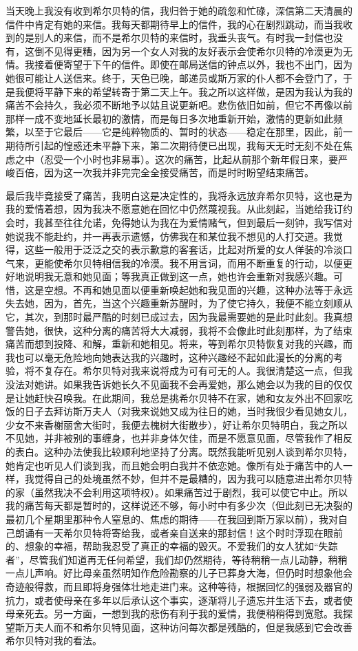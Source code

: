 \par 当天晚上我没有收到希尔贝特的信，我归咎于她的疏忽和忙碌，深信第二天清晨的信件中肯定有她的来信。我每天都期待早上的信件，我的心在剧烈跳动，而当我收到的是别人的来信，而不是希尔贝特的来信时，我垂头丧气。有时我一封信也没有，这倒不见得更糟，因为另一个女人对我的友好表示会使希尔贝特的冷漠更为无情。我接着便寄望于下午的信件。即使在邮局送信的钟点以外，我也不出门，因为她很可能让人送信来。终于，天色已晚，邮递员或斯万家的仆人都不会登门了，于是我便将平静下来的希望转寄于第二天上午。我之所以这样做，是因为我认为我的痛苦不会持久，我必须不断地予以姑且说更新吧。悲伤依旧如前，但它不再像以前那样一成不变地延长最初的激情，而是每日多次地重新开始，激情的更新如此频繁，以至于它最后——它是纯粹物质的、暂时的状态——稳定在那里，因此，前一期待所引起的惶惑还未平静下来，第二次期待便已出现，我每天无时无刻不处在焦虑之中（忍受一个小时也非易事）。这次的痛苦，比起从前那个新年假日来，要严峻百倍，因为这一次我并非完完全全接受痛苦，而是时时盼望结束痛苦。
\par 最后我毕竟接受了痛苦，我明白这是决定性的，我将永远放弃希尔贝特，这也是为我的爱情着想，因为我决不愿意她在回忆中仍然蔑视我。从此刻起，当她给我订约会时，我甚至往往允诺，免得她认为我在为爱情赌气，但到最后一刻钟，我写信对她说我不能赴约，并一再表示遗憾，仿佛我在和某位我不想见的人打交道。我觉得，这些一般用于泛泛之交的表示歉意的客套话，比起对所爱的女人佯装的冷淡口气来，更能使希尔贝特相信我的冷漠。我不用言词，而用不断重复的行动，以便更好地说明我无意和她见面；等我真正做到这一点，她也许会重新对我感兴趣。可惜，这是空想。不再和她见面以便重新唤起她和我见面的兴趣，这种办法等于永远失去她，因为，首先，当这个兴趣重新苏醒时，为了使它持久，我便不能立刻顺从它，其次，到那时最严酷的时刻已成过去，因为我最需要她的是此时此刻。我真想警告她，很快，这种分离的痛苦将大大减弱，我将不会像此时此刻那样，为了结束痛苦而想到投降、和解，重新和她相见。将来，等到希尔贝特恢复对我的兴趣，而我也可以毫无危险地向她表达我的兴趣时，这种兴趣经不起如此漫长的分离的考验，将不复存在。希尔贝特对我来说将成为可有可无的人。我很清楚这一点，但我没法对她讲。如果我告诉她长久不见面我不会再爱她，那么她会以为我的目的仅仅是让她赶快召唤我。在此期间，我总是挑希尔贝特不在家，她和女友外出不回家吃饭的日子去拜访斯万夫人（对我来说她又成为往日的她，当时我很少看见她女儿，少女不来香榭丽舍大街时，我便去槐树大街散步），好让希尔贝特明白，我之所以不见她，并非被别的事缠身，也并非身体欠佳，而是不愿意见面，尽管我作了相反的表白。这种办法使我比较顺利地坚持了分离。既然我能听见别人谈到希尔贝特，她肯定也听见人们谈到我，而且她会明白我并不依恋她。像所有处于痛苦中的人一样，我觉得自己的处境虽然不妙，但并不是最糟的，因为我可以随意进出希尔贝特的家（虽然我决不会利用这项特权）。如果痛苦过于剧烈，我可以使它中止。所以我的痛苦每天都是暂时的，这样说还不够，每小时中有多少次（但此刻已无决裂的最初几个星期里那种令人窒息的、焦虑的期待——在我回到斯万家以前），我对自己朗诵有一天希尔贝特将寄给我，或者亲自送来的那封信！这个时时浮现在眼前的、想象的幸福，帮助我忍受了真正的幸福的毁灭。不爱我们的女人犹如“失踪者”，尽管我们知道再无任何希望，我们却仍然期待，等待稍稍一点儿动静，稍稍一点儿声响。好比母亲虽然明知作危险勘察的儿子已葬身大海，但仍时时想象他会奇迹般得救，而且即将身强体壮地走进门来。这种等待，根据回忆的强弱及器官的抗力，或者使母亲在多年以后承认这个事实，逐渐将儿子遗忘并生活下去，或者使母亲死去。另一方面，一想到我的悲伤有利于我的爱情，我便稍稍得到宽慰。我探望斯万夫人而不和希尔贝特见面，这种访问每次都是残酷的，但是我感到它会改善希尔贝特对我的看法。

